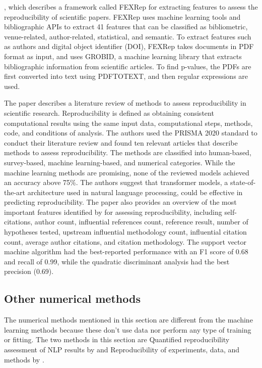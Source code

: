 \documentclass[12pt, a4paper, twocolumn]{article}
\begin{document}
			\citet{wu2021predicting}, which describes a framework called FEXRep for extracting features to assess the reproducibility of scientific papers. FEXRep uses machine learning tools and bibliographic APIs to extract 41 features that can be classified as bibliometric, venue-related, author-related, statistical, and semantic. To extract features such as authors and digital object identifier (DOI), FEXRep takes documents in PDF format as input, and uses GROBID, a machine learning library that extracts bibliographic information from scientific articles. To find p-values, the PDFs are first converted into text using PDFTOTEXT, and then regular expressions are used.
			

			The paper describes a literature review of methods to assess reproducibility in scientific research. Reproducibility is defined as obtaining consistent computational results using the same input data, computational steps, methods, code, and conditions of analysis. The authors used the PRISMA 2020 standard to conduct their literature review and found ten relevant articles that describe methods to assess reproducibility. The methods are classified into human-based, survey-based, machine learning-based, and numerical categories. While the machine learning methods are promising, none of the reviewed models achieved an accuracy above 75\%. The authors suggest that transformer models, a state-of-the-art architecture used in natural language processing, could be effective in predicting reproducibility. The paper also provides an overview of the most important features identified by \citet{wu2021predicting} for assessing reproducibility, including self-citations, author count, influential references count, reference result, number of hypotheses tested, upstream influential methodology count, influential citation count, average author citations, and citation methodology. The support vector machine algorithm had the best-reported performance with an F1 score of 0.68 and recall of 0.99, while the quadratic discriminant analysis had the best precision (0.69).

		\subsection{Other numerical methods} \label{sec:num_methods}

			 The numerical methods mentioned in this section are different from the machine learning methods because these don’t use data nor perform any type of training or fitting. The two methods in this section are Quantified reproducibility assessment of NLP results by \citet{belz2022quantified} and Reproducibility of experiments, data, and methods by \citet{gundersen2018state}. 
\end{document}
